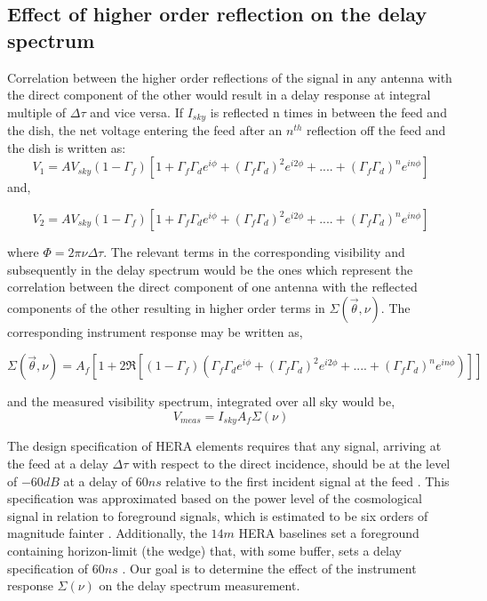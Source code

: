 \documentclass[12pt,preprint]{aastex}
\begin{document}
\subsection{Effect of higher order reflection on the delay spectrum} 
Correlation between the higher order reflections of the signal in any antenna with the direct component of the other would result in a delay response at integral multiple of $\Delta \tau$ and vice versa. 
If $I_{sky}$ is reflected n times in between the feed and the dish, the net voltage entering the feed after an
$n^{th}$ reflection off the feed and the dish is written as:
\begin{equation}
V_{1} =  A V_{sky}(1-\Gamma_{f})[1+ \Gamma_{f}\Gamma_{d} e^{i\phi}+ (\Gamma_{f}\Gamma_{d})^2e^{i2\phi}+ ....+ (\Gamma_{f}\Gamma_{d})^{n}e^{in\phi}]
\end{equation}
and, 

\begin{equation}
V_{2} = A V_{sky}(1-\Gamma_{f})[1+ \Gamma_{f}\Gamma_{d} e^{i\phi}+ (\Gamma_{f}\Gamma_{d})^2e^{i2\phi}+ ....+ (\Gamma_{f}\Gamma_{d})^{n}e^{in\phi}]
\end{equation}

where $\Phi = 2\pi\nu\Delta \tau$. The relevant terms in the corresponding visibility and subsequently in the delay spectrum would be the ones which represent the correlation between the direct component of one antenna with the reflected components of the other resulting in higher order terms  in $\Sigma(\vec \theta, \nu)$. The corresponding instrument response may be written as, 

\begin{equation}
\Sigma(\vec \theta, \nu) = A_{f} \left [ 1+ 2 \Re \left [(1-\Gamma_{f})( \Gamma_{f}\Gamma_{d} e^{i\phi}+ (\Gamma_{f}\Gamma_{d})^2e^{i2\phi}+ ....+ (\Gamma_{f}\Gamma_{d})^{n}e^{in\phi}) \right ]\right ]
\end{equation}

and the measured visibility spectrum, integrated over all sky would be, 
\begin{equation}\label{eqn:series1}
V_{meas}  = I_{sky}A_{f}\Sigma( \nu)
\end{equation}

The design specification of HERA elements requires that any
signal, arriving at the feed at a delay $\Delta \tau$ with respect to the direct incidence, should be
at the level of $-60dB$ at a delay of $60ns$ relative to the first incident
signal at the feed \citep{parsons_deboer_memo}. This specification was
approximated based on the power level of the cosmological signal in relation to
foreground signals, which is estimated to be six orders of magnitude fainter
\citep{santos_et_al2005,ali_et_al2008,deoliveira2008,jelic_et_al2008,bernardi_et_al2009,bernardi_et_al2010,ghosh_et_al2011}. Additionally, the $14m$ HERA baselines set a foreground containing
horizon-limit (the wedge) that, with some buffer, sets a delay specification of
$60ns$
\citep{parsons_et_al2012b,vedantham_et_al2012,nithya_et_al2013,liu_et_al2014a,liu_et_al2014b}. Our goal is to determine the effect of the instrument response $\Sigma(\nu)$ on the delay spectrum measurement. 
\end{document}
